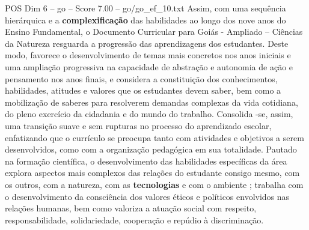 \begin{textsample}{POS Dim 6 – go – Score 7.00 – go/go\_ef\_10.txt}
Assim, com uma sequência hierárquica e a \textbf{complexificação} das habilidades ao longo dos nove anos do Ensino Fundamental, o Documento Curricular para Goiás - Ampliado – Ciências da Natureza resguarda a progressão das aprendizagens dos estudantes.
Deste modo, favorece o desenvolvimento de temas mais concretos nos anos iniciais e uma ampliação progressiva na capacidade de abstração e autonomia de ação e pensamento nos anos finais, e considera a constituição dos conhecimentos, habilidades, atitudes e valores que os estudantes devem saber, bem como a mobilização de saberes para resolverem demandas complexas da vida cotidiana, do pleno exercício da cidadania e do mundo do trabalho.
Consolida -se, assim, uma transição suave e sem rupturas no processo do aprendizado escolar, enfatizando que o currículo se preocupa tanto com atividades e objetivos a serem desenvolvidos, como com a organização pedagógica em sua totalidade.
Pautado na formação científica, o desenvolvimento das habilidades específicas da área explora aspectos mais complexos das relações do estudante consigo mesmo, com os outros, com a natureza, com as \textbf{tecnologias} e com o ambiente ; trabalha com o desenvolvimento da consciência dos valores éticos e políticos envolvidos nas relações humanas, bem como valoriza a atuação social com respeito, responsabilidade, solidariedade, cooperação e repúdio à discriminação.

\end{textsample}
